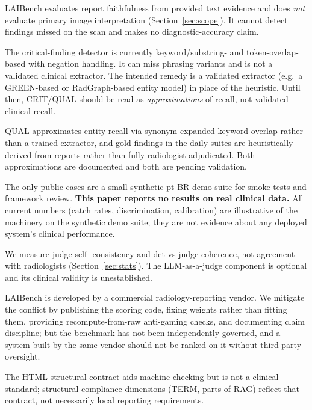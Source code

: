 \documentclass[11pt]{article}
\newcommand{\dimname}[1]{\textsc{#1}}
\begin{document}
\begin{description}[leftmargin=0.6cm,style=nextline]
\item[Text, not image.] LAIBench evaluates report faithfulness from provided
text evidence and does \emph{not} evaluate primary image interpretation
(Section~\ref{sec:scope}). It cannot detect findings missed on the scan and
makes no diagnostic-accuracy claim.
\item[Keyword/substring critical detector.] The critical-finding detector is
currently keyword/substring- and token-overlap-based with negation handling. It
can miss phrasing variants and is not a validated clinical extractor. The
intended remedy is a validated extractor (e.g.\ a GREEN-based
\cite{Ostmeier2024GREEN} or RadGraph-based \cite{Jain2021RadGraph} entity model)
in place of the heuristic. Until then, \dimname{CRIT}/\dimname{QUAL} should be
read as \emph{approximations} of recall, not validated clinical recall.
\item[Heuristic gold and approximate entity recall.] \dimname{QUAL} approximates
entity recall via synonym-expanded keyword overlap rather than a trained
extractor, and gold findings in the daily suites are heuristically derived from
reports rather than fully radiologist-adjudicated. Both approximations are
documented and both are pending validation.
\item[Synthetic-only public data; no real-data results yet.] The only public
cases are a small synthetic pt-BR demo suite for smoke tests and framework
review. \textbf{This paper reports no results on real clinical data.} All current
numbers (catch rates, discrimination, calibration) are illustrative of the
machinery on the synthetic demo suite; they are not evidence about any deployed
system's clinical performance.
\item[Unmeasured judge-vs-radiologist reliability.] We measure judge self-
consistency and det-vs-judge coherence, not agreement with radiologists
(Section~\ref{sec:stats}). The LLM-as-a-judge component is optional and its
clinical validity is unestablished.
\item[Vendor-built.] LAIBench is developed by a commercial radiology-reporting
vendor. We mitigate the conflict by publishing the scoring code, fixing weights
rather than fitting them, providing recompute-from-raw anti-gaming checks, and
documenting claim discipline; but the benchmark has not been independently
governed, and a system built by the same vendor should not be ranked on it
without third-party oversight.
\item[Constrained output contract.] The HTML structural contract aids machine
checking but is not a clinical standard; structural-compliance dimensions
(\dimname{TERM}, parts of \dimname{RAG}) reflect that contract, not necessarily
local reporting requirements.
\end{description}
\end{document}
